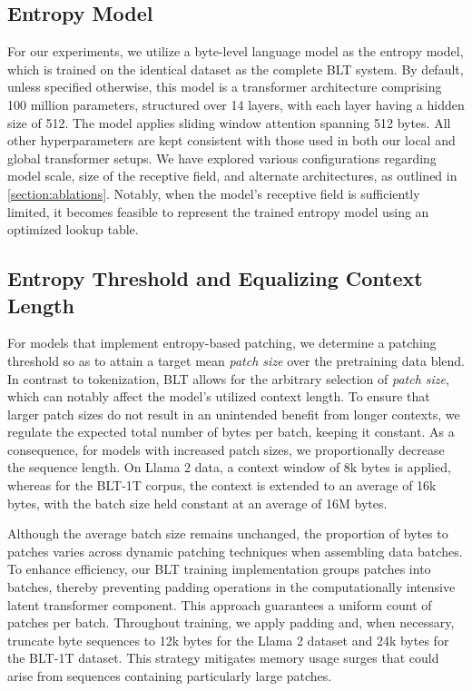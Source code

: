 \subsection{Entropy Model} For our experiments, we utilize a byte-level language model as the entropy model, which is trained on the identical dataset as the complete {\textsc BLT} system. By default, unless specified otherwise, this model is a transformer architecture comprising 100 million parameters, structured over 14 layers, with each layer having a hidden size of 512. The model applies sliding window attention spanning 512 bytes. All other hyperparameters are kept consistent with those used in both our local and global transformer setups. We have explored various configurations regarding model scale, size of the receptive field, and alternate architectures, as outlined in \autoref{section:ablations}. Notably, when the model’s receptive field is sufficiently limited, it becomes feasible to represent the trained entropy model using an optimized lookup table.

\subsection{Entropy Threshold and Equalizing Context Length} For models that implement entropy-based patching, we determine a patching threshold so as to attain a target mean \textit{patch size} over the pretraining data blend. In contrast to tokenization, {\textsc BLT} allows for the arbitrary selection of \textit{patch size}, which can notably affect the model's utilized context length. To ensure that larger patch sizes do not result in an unintended benefit from longer contexts, we regulate the expected total number of bytes per batch, keeping it constant. As a consequence, for models with increased patch sizes, we proportionally decrease the sequence length. On Llama 2 data, a context window of 8k bytes is applied, whereas for the {\textsc BLT}-1T corpus, the context is extended to an average of 16k bytes, with the batch size held constant at an average of 16M bytes.

Although the average batch size remains unchanged, the proportion of bytes to patches varies across dynamic patching techniques when assembling data batches. To enhance efficiency, our {\textsc BLT} training implementation groups patches into batches, thereby preventing padding operations in the computationally intensive latent transformer component. This approach guarantees a uniform count of patches per batch. Throughout training, we apply padding and, when necessary, truncate byte sequences to 12k bytes for the Llama 2 dataset and 24k bytes for the {\textsc BLT}-1T dataset. This strategy mitigates memory usage surges that could arise from sequences containing particularly large patches.

